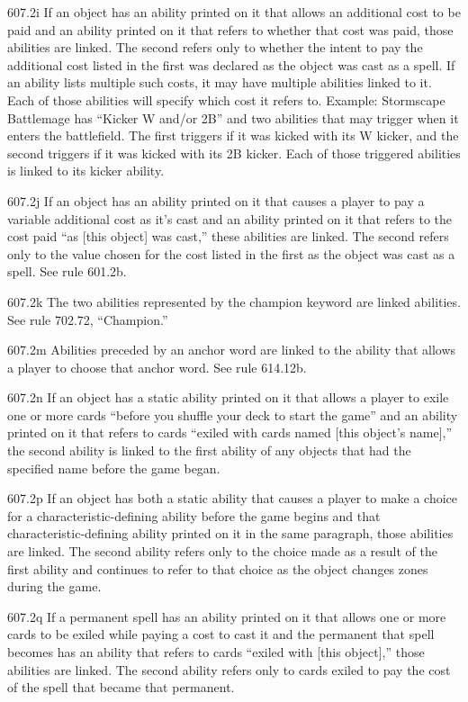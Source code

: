 607.2i If an object has an ability printed on it that allows an additional cost to be paid and an ability printed on it that refers to whether that cost was paid, those abilities are linked. The second refers only to whether the intent to pay the additional cost listed in the first was declared as the object was cast as a spell. If an ability lists multiple such costs, it may have multiple abilities linked to it. Each of those abilities will specify which cost it refers to.
Example: Stormscape Battlemage has “Kicker {W} and/or {2}{B}” and two abilities that may trigger when it enters the battlefield. The first triggers if it was kicked with its {W} kicker, and the second triggers if it was kicked with its {2}{B} kicker. Each of those triggered abilities is linked to its kicker ability.

607.2j If an object has an ability printed on it that causes a player to pay a variable additional cost as it’s cast and an ability printed on it that refers to the cost paid “as [this object] was cast,” these abilities are linked. The second refers only to the value chosen for the cost listed in the first as the object was cast as a spell. See rule 601.2b.

607.2k The two abilities represented by the champion keyword are linked abilities. See rule 702.72, “Champion.”

607.2m Abilities preceded by an anchor word are linked to the ability that allows a player to choose that anchor word. See rule 614.12b.

607.2n If an object has a static ability printed on it that allows a player to exile one or more cards “before you shuffle your deck to start the game” and an ability printed on it that refers to cards “exiled with cards named [this object’s name],” the second ability is linked to the first ability of any objects that had the specified name before the game began.

607.2p If an object has both a static ability that causes a player to make a choice for a characteristic-defining ability before the game begins and that characteristic-defining ability printed on it in the same paragraph, those abilities are linked. The second ability refers only to the choice made as a result of the first ability and continues to refer to that choice as the object changes zones during the game.

607.2q If a permanent spell has an ability printed on it that allows one or more cards to be exiled while paying a cost to cast it and the permanent that spell becomes has an ability that refers to cards “exiled with [this object],” those abilities are linked. The second ability refers only to cards exiled to pay the cost of the spell that became that permanent.

